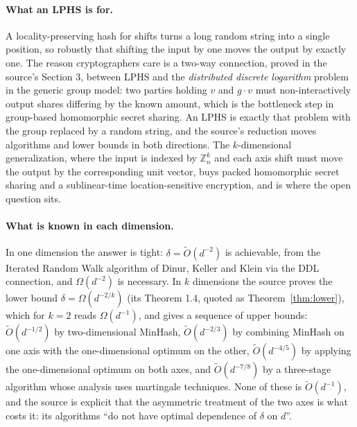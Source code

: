 \documentclass{aicr-conjecture}
\newcommand{\Z}{\mathbb{Z}}
\newcommand{\Ot}{\widetilde{O}}
\newcommand{\Om}{\Omega}
\begin{document}
\paragraph{What an LPHS is for.}
A locality-preserving hash for shifts turns a long random string into a
single position, so robustly that shifting the input by one moves the
output by exactly one. The reason cryptographers care is a two-way
connection, proved in the source's Section 3, between LPHS and the
\emph{distributed discrete logarithm} problem in the generic group
model: two parties holding $v$ and $g \cdot v$ must non-interactively
output shares differing by the known amount, which is the bottleneck
step in group-based homomorphic secret sharing. An LPHS is exactly that
problem with the group replaced by a random string, and the source's
reduction moves algorithms and lower bounds in both directions. The
$k$-dimensional generalization, where the input is indexed by
$\Z_{n}^{k}$ and each axis shift must move the output by the
corresponding unit vector, buys packed homomorphic secret sharing and a
sublinear-time location-sensitive encryption, and is where the open
question sits.

\paragraph{What is known in each dimension.}
In one dimension the answer is tight: $\delta = \Ot(d^{-2})$ is
achievable, from the Iterated Random Walk algorithm of Dinur, Keller and
Klein via the DDL connection, and $\Om(d^{-2})$ is necessary. In $k$
dimensions the source proves the lower bound
$\delta = \Om(d^{-2/k})$ (its Theorem 1.4, quoted as
Theorem~\ref{thm:lower}), which for $k = 2$ reads $\Om(d^{-1})$, and
gives a sequence of upper bounds: $\Ot(d^{-1/2})$ by two-dimensional
MinHash, $\Ot(d^{-2/3})$ by combining MinHash on one axis with the
one-dimensional optimum on the other, $\Ot(d^{-4/5})$ by applying the
one-dimensional optimum on both axes, and $\Ot(d^{-7/8})$ by a
three-stage algorithm whose analysis uses martingale techniques. None of
these is $\Ot(d^{-1})$, and the source is explicit that the asymmetric
treatment of the two axes is what costs it: its algorithms ``do not have
optimal dependence of $\delta$ on $d$''.
\end{document}
